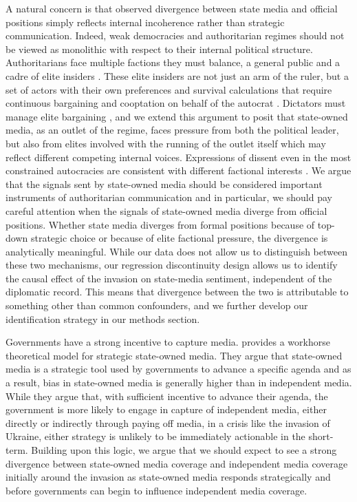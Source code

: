 \documentclass[12pt]{article}
\begin{document}
A natural concern is that observed divergence between state media and official positions simply reflects internal incoherence rather than strategic communication. Indeed, weak democracies and authoritarian regimes should not be viewed as monolithic with respect to their internal political structure. Authoritarians face multiple factions they must balance, a general public and a cadre of elite insiders \citep{svolik_politics_2012}. These elite insiders are not just an arm of the ruler, but a set of actors with their own preferences and survival calculations that require continuous bargaining and cooptation on behalf of the autocrat \citep{bueno_de_mesquita_logic_2003}. Dictators must manage elite bargaining \citep{gandhi_political_2008}, and we extend this argument to posit that state-owned media, as an outlet of the regime, faces pressure from both the political leader, but also from elites involved with the running of the outlet itself which may reflect different competing internal voices. Expressions of dissent even in the most constrained autocracies are consistent with different factional interests \citep{malesky_nodding_2010}. We argue that the signals sent by state-owned media should be considered important instruments of authoritarian communication and in particular, we should pay careful attention when the signals of state-owned media diverge from official positions. Whether state media diverges from formal positions because of top-down strategic choice or because of elite factional pressure, the divergence is analytically meaningful. While our data does not allow us to distinguish between these two mechanisms, our regression discontinuity design allows us to identify the causal effect of the invasion on state-media sentiment, independent of the diplomatic record. This means that divergence between the two is attributable to something other than common confounders, and we further develop our identification strategy in our methods section.



Governments have a strong incentive to capture media. \citet{gehlbach_government_2014} provides a workhorse theoretical model for strategic state-owned media. They argue that state-owned media is a strategic tool used by governments to advance a specific agenda and as a result, bias in state-owned media is generally higher than in independent media. While they argue that, with sufficient incentive to advance their agenda, the government is more likely to engage in capture of independent media, either directly or indirectly through paying off media, in a crisis like the invasion of Ukraine, either strategy is unlikely to be immediately actionable in the short-term. Building upon this logic, we argue that we should expect to see a strong divergence between state-owned media coverage and independent media coverage initially around the invasion as state-owned media responds strategically and before governments can begin to influence independent media coverage. 
\end{document}
